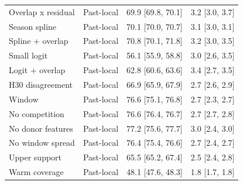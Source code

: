 {\begin{longtable}{p{}p{}p{}p{}}
Overlap x residual & Past-local & 69.9 [69.8, 70.1] & 3.2 [3.0, 3.7] \\
Season spline & Past-local & 70.1 [70.0, 70.7] & 3.1 [3.0, 3.1] \\
Spline + overlap & Past-local & 70.8 [70.1, 71.8] & 3.2 [3.0, 3.5] \\
Small logit & Past-local & 56.1 [55.9, 58.8] & 3.0 [2.6, 3.5] \\
Logit + overlap & Past-local & 62.8 [60.6, 63.6] & 3.4 [2.7, 3.5] \\
H30 disagreement & Past-local & 66.9 [65.9, 67.9] & 2.7 [2.6, 2.9] \\
Window & Past-local & 76.6 [75.1, 76.8] & 2.7 [2.3, 2.7] \\
No competition & Past-local & 76.6 [76.4, 76.7] & 2.7 [2.7, 2.8] \\
No donor features & Past-local & 77.2 [75.6, 77.7] & 3.0 [2.4, 3.0] \\
No window spread & Past-local & 76.4 [75.4, 76.6] & 2.7 [2.4, 2.7] \\
Upper support & Past-local & 65.5 [65.2, 67.4] & 2.5 [2.4, 2.8] \\
Warm coverage & Past-local & 48.1 [47.6, 48.3] & 1.8 [1.7, 1.8] \\
\bottomrule
\end{longtable}
}

